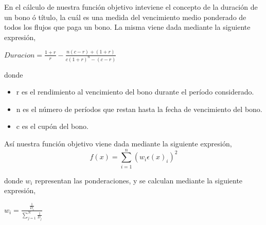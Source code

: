 \vspace{0.5cm}

\hspace{0.4cm} En el c\'alculo de nuestra funci\'on objetivo inteviene el concepto de la duraci\'on de un bono \'o t\'itulo, la cu\'al es una medida del vencimiento medio ponderado de todos los flujos que paga un bono. La misma viene dada mediante la siguiente expresi\'on, \\

\begin{center}

$\displaystyle{Duracion = \frac{1+r}{r} - \frac{n(c-r)+(1+r)}{c(1+r)^{n}-(c-r)}}$

\end{center}

\vspace{0.5cm}

\newpage

\noindent donde

\begin{itemize}
  \item r es el rendimiento al vencimiento del bono durante el per\'iodo considerado.
  \item n es el n\'umero de per\'iodos que restan hasta la fecha de vencimiento del bono.
  \item c es el cup\'on del bono.
\end{itemize}


\vspace{0.5cm}

\hspace{0.4cm} As\'i nuestra funci\'on objetivo viene dada mediante la siguiente expresi\'on,\\

\begin{equation}\label{ecua2}
  f(x) = \sum_{i=1}^{n} (w_{i}\epsilon(x)_{i} )^2
\end{equation}



\vspace{0.5cm}
\noindent donde $w_{i}$ representan las ponderaciones, y se calculan mediante la siguiente expresi\'on,\\

\begin{center}

$\displaystyle{w_{i} = \frac{\frac{1}{D_{i}}}{\sum_{j=1}^{N}\frac{1}{D_{j}}}}$

\end{center}


